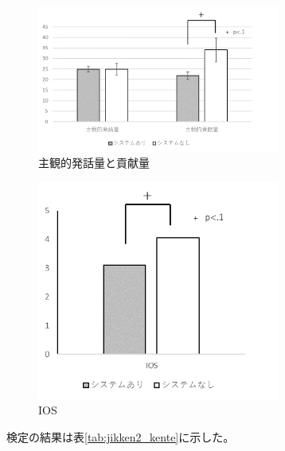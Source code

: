 \documentclass[11pt, a4paper]{jreport} %
\begin{document}
\begin{figure}[htbp]
\begin{center}
\includegraphics[width=80mm]{images/jikken2_shu}
\caption{主観的発話量と貢献量}
\label{fig:jikken2_shu}
\end{center}
\end{figure}

\begin{figure}[htbp]
\begin{center}
\includegraphics[width=80mm]{images/jikken2_IOS}
\caption{IOS}
\label{fig:jikken2_IOS}
\end{center}
\end{figure}

検定の結果は表\ref{tab:jikken2_kente}に示した。
\end{document}
